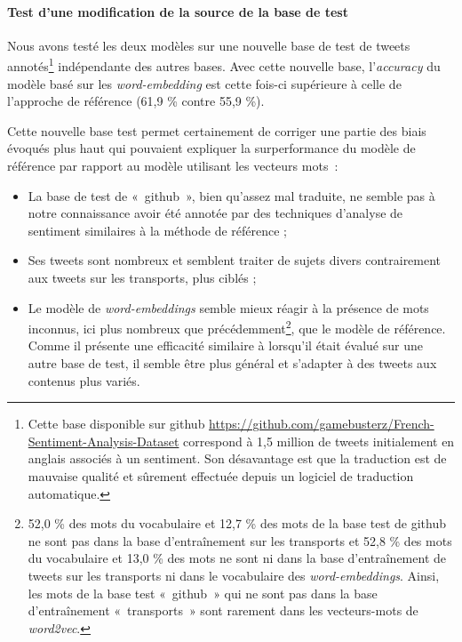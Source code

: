 \documentclass[11pt,french,french]{article}
\let\rmarkdownfootnote\footnote%
\def\footnote{\protect\rmarkdownfootnote}
\begin{document}
\hypertarget{subsec:basegit}{%
\paragraph{Test d'une modification de la source de la base de test}\label{subsec:basegit}}

Nous avons testé les deux modèles sur une nouvelle base de test de tweets annotés\footnote{Cette base disponible sur github \url{https://github.com/gamebusterz/French-Sentiment-Analysis-Dataset} correspond à 1,5 million de tweets initialement en anglais associés à un sentiment.
  Son désavantage est que la traduction est de mauvaise qualité et sûrement effectuée depuis un logiciel de traduction automatique.} indépendante des autres bases.
Avec cette nouvelle base, l'\emph{accuracy} du modèle basé sur les \emph{word-embedding} est cette fois-ci supérieure à celle de l'approche de référence (61,9 \% contre 55,9 \%).

Cette nouvelle base test permet certainement de corriger une partie des biais évoqués plus haut qui pouvaient expliquer la surperformance du modèle de référence par rapport au modèle utilisant les vecteurs mots~:

\begin{itemize}
\item
  La base de test de «~github~», bien qu'assez mal traduite, ne semble pas à notre connaissance avoir été annotée par des techniques d'analyse de sentiment similaires à la méthode de référence ;
\item
  Ses tweets sont nombreux et semblent traiter de sujets divers contrairement aux tweets sur les transports, plus ciblés ;
\item
  Le modèle de \emph{word-embeddings} semble mieux réagir à la présence de mots inconnus, ici plus nombreux que précédemment\footnote{52,0 \% des mots du vocabulaire et 12,7 \% des mots de la base test de github ne sont pas dans la base d'entraînement sur les transports et 52,8 \% des mots du vocabulaire et 13,0 \% des mots ne sont ni dans la base d'entraînement de tweets sur les transports ni dans le vocabulaire des \emph{word-embeddings}.
    Ainsi, les mots de la base test «~github~» qui ne sont pas dans la base d'entraînement «~transports~» sont rarement dans les vecteurs-mots de \emph{word2vec}.}, que le modèle de référence.
  Comme il présente une efficacité similaire à lorsqu'il était évalué sur une autre base de test, il semble être plus général et s'adapter à des tweets aux contenus plus variés.
\end{itemize}
\end{document}
